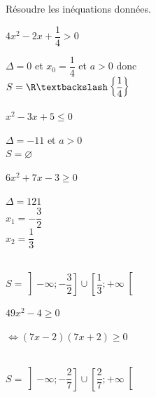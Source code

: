 \documentclass[12pt,a4paper]{article}  %
\begin{document}
Résoudre les inéquations données.
\begin{enumMet}
    \item $4 x^{2}-2 x+\dfrac{1}{4}>0$\\
    \begin{corrBox}
        $\Delta=0$ et $x_0=\dfrac{1}{4}$ et $a>0$ donc\\ $S=\R\textbackslash\left\{\dfrac{1}{4}\right\}$
    \end{corrBox}
    \item {} $x^{2}-3 x+5 \leqslant 0$\\
    \begin{corrBox}
        $\Delta=-11$ et $a>0$\\
        $S=\varnothing$ 
    \end{corrBox}
    \item $6 x^{2}+7 x-3 \geqslant 0$\\
    \begin{corrBox}
        $\Delta=121$\\
        $x_1=-\dfrac{3}{2}$\\
        $x_2=\dfrac{1}{3}$\\
        \\
        $S=\left]-\infty;-\dfrac{3}{2}\right]\cup\left[\dfrac{1}{3}; +\infty\right[$
    \end{corrBox}
    \item $49 x^{2}-4 \geqslant 0$\\
    \begin{corrBox}
        $\iff (7x-2)(7x+2) \geqslant 0$\\
        \\
        $S=\left]-\infty;-\dfrac{2}{7}\right]\cup\left[\dfrac{2}{7}; +\infty\right[$
    \end{corrBox}
\end{enumMet}
\end{document}
